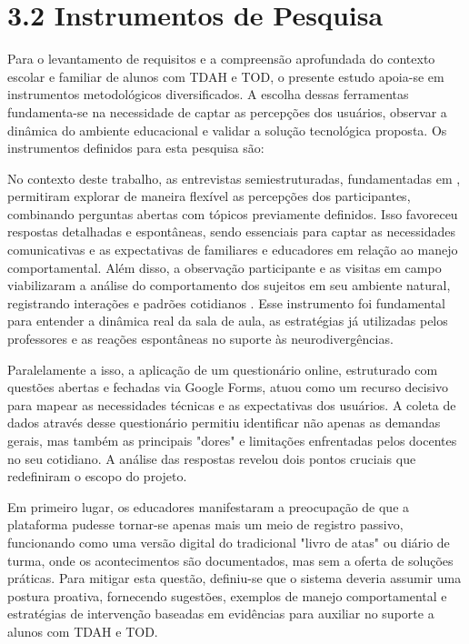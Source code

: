 \vspace{0.5cm}
\section{3.2 Instrumentos de Pesquisa}

    Para o levantamento de requisitos e a compreensão aprofundada do contexto escolar e
familiar de alunos com 
TDAH e TOD, o presente estudo apoia-se em instrumentos metodológicos diversificados. A escolha dessas 
ferramentas fundamenta-se na necessidade de captar as percepções dos usuários, observar a dinâmica do ambiente 
educacional e validar a solução tecnológica proposta. Os instrumentos definidos para esta pesquisa são:
\vspace{0.3cm}

No contexto deste trabalho, as entrevistas semiestruturadas, fundamentadas em , permitiram explorar de maneira flexível as percepções dos participantes, combinando perguntas abertas com tópicos previamente definidos. Isso favoreceu respostas detalhadas e espontâneas, sendo essenciais para captar as necessidades comunicativas e as expectativas de familiares e educadores em relação ao manejo comportamental. Além disso, a observação participante e as visitas em campo viabilizaram a análise do comportamento dos sujeitos em seu ambiente natural, registrando interações e padrões cotidianos . Esse instrumento foi fundamental para entender a dinâmica real da sala de aula, as estratégias já utilizadas pelos professores e as reações espontâneas no suporte às neurodivergências.

Paralelamente a isso, a aplicação de um questionário online, estruturado com questões abertas e fechadas via Google Forms, atuou como um recurso decisivo para mapear as necessidades técnicas e as expectativas dos usuários. A coleta de dados através desse questionário permitiu identificar não apenas as demandas gerais, mas também as principais "dores" e limitações enfrentadas pelos docentes no seu cotidiano. A análise das respostas revelou dois pontos cruciais que redefiniram o escopo do projeto.

Em primeiro lugar, os educadores manifestaram a preocupação de que a plataforma pudesse tornar-se apenas mais um meio de registro passivo, funcionando como uma versão digital do tradicional "livro de atas" ou diário de turma, onde os acontecimentos são documentados, mas sem a oferta de soluções práticas. Para mitigar esta questão, definiu-se que o sistema deveria assumir uma postura proativa, fornecendo sugestões, exemplos de manejo comportamental e estratégias de intervenção baseadas em evidências para auxiliar no suporte a alunos com TDAH e TOD.

